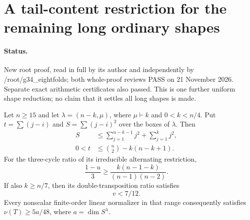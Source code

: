 \section{A tail-content restriction for the remaining long ordinary shapes}
\label{sec:ordinary-alternating-long-row}

\paragraph{Status.}
New root proof, read in full by its author and independently by
/root/g34\_eightfolds; both whole-proof reviews PASS on 21 November
2026. Separate exact arithmetic certificates also passed. This is one further uniform shape reduction;
no claim that it settles all long shapes is made.

\begin{lemma}
\label{HD-ALT-05a}
Let $n\ge15$ and let $\lambda=(n-k,\mu)$, where $\mu\vdash k$
and $0<k<n/4$. Put $t=\sum(j-i)$ and $S=\sum(j-i)^2$ over
the boxes of $\lambda$. Then
\begin{align}
 S&\le\sum_{j=1}^{n-k-1}j^2+\sum_{j=1}^k j^2,               \tag{ALTL.1}\\
 0<t&\le\binom n2-k(n-k+1).                                \tag{ALTL.2}
\end{align}
For the three-cycle ratio of its irreducible alternating restriction,
\[
 \frac{1-u}{3}\ge\frac{k(n-1-k)}{(n-1)(n-2)}.
                                                               \tag{ALTL.3}
\]
If also $k\ge n/7$, then its double-transposition ratio satisfies
\[
                         v<7/12.
                                                               \tag{ALTL.4}
\]
Every nonscalar finite-order linear normalizer in that range consequently
satisfies $\nu(T)\ge5a/48$, where $a=\dim S^\lambda$.
\end{lemma}

